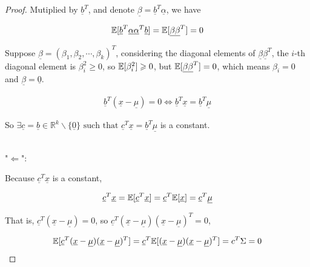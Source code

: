 \documentclass[a4paper]{article}
\begin{document}
\begin{enumerate}
\begin{enumerate}
\begin{enumerate}
\begin{proof}
      Mutiplied by $\underline{b}^T$, and denote $\underline{\beta} =\underline{b}^T\underline{\alpha} $, we have 

      \begin{equation}
        \begin{aligned}
          \mathbb{E}[\underline{b}^T\underline{\alpha}\underline{\alpha}^T \underline{b}] = \mathbb{E}[\underline{\beta} \underline{\beta}^T] = 0
        \end{aligned}
      \end{equation}

      Suppose $\underline{\beta} = (\beta_1,\beta_2,\cdots,\beta_k)^T$, considering the diagonal elements of $\underline{\beta} \underline{\beta}^T$, the $i$-th diagonal element is $\beta_{i}^2\geqslant 0$, so $\mathbb{E}[\beta_i^2] \geqslant 0$, but $\mathbb{E}[\underline{\beta} \underline{\beta}^T] = 0$, which means $\beta_i = 0$ and $\underline{\beta} = \underline{0}$.

      \begin{equation}
        \begin{aligned}
          \underline{b}^T(\underline{x}-\underline{\mu}) = 0 \Longleftrightarrow \underline{b}^T\underline{x}= \underline{b}^T\underline{\mu}
        \end{aligned}
      \end{equation}

      So $\exists \underline{c} = \underline{b} \in \mathbb{R}^k \backslash \{\underline{0}\} \text{ such that } \underline{c}^T \underline{x} = \underline{b}^T \underline{\mu} $ is a constant.

      ~\\

      "$\Longleftarrow$":

        Because $\underline{c}^T \underline{x}$ is a constant,

        \begin{equation}
          \underline{c}^T \underline{x} = \mathbb{E}[\underline{c}^T \underline{x}] = \underline{c}^T \mathbb{E}[ \underline{x}] = \underline{c}^T \underline{\mu}
        \end{equation}

        That is, $\underline{c}^T(\underline{x} - \underline{\mu}) = 0$, so $\underline{c}^T(\underline{x} - \underline{\mu})(\underline{x} - \underline{\mu})^T = 0$,

        \begin{equation}
           \mathbb{E}[\underline{c}^T(\underline{x} - \underline{\mu})(\underline{x} - \underline{\mu})^T] = \underline{c}^T \mathbb{E}[(\underline{x} - \underline{\mu})(\underline{x} - \underline{\mu})^T] = c^T \Sigma  = 0
        \end{equation}


\end{proof}
\end{enumerate}
\end{enumerate}
\end{enumerate}
\end{document}
